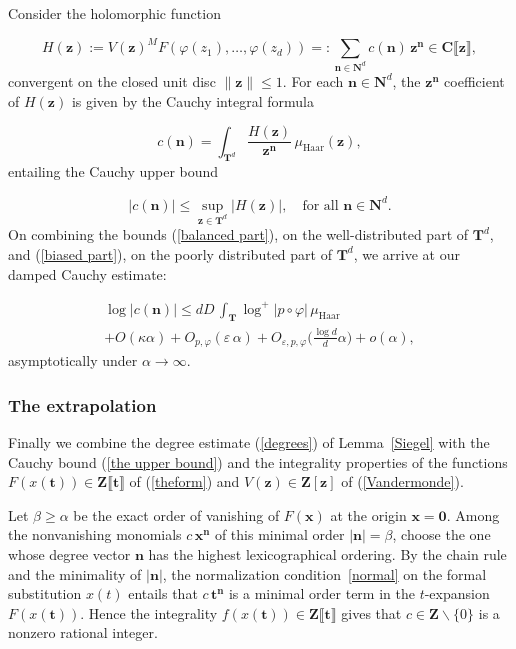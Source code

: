 \documentclass[10pt]{amsart}
\def\N{\pleaseuseothercommand}
\def\NwithzeroB{\mathbf{N}}
\renewcommand\setminus{\smallsetminus}
\def\T{\mathbf{T}}
\def\Z{\mathbf{Z}}
\theoremstyle{remark}
\numberwithin{equation}{subsection}
\def\numequation{\addtocounter{subsubsection}{1}\begin{equation}}
\def\C{\mathbf{C}}
\begin{document}
Consider the holomorphic function
\numequation  \label{our damped function}
H(\mathbf{z}) :=     V( \mathbf{z})^M    F(\varphi(z_1), \ldots, \varphi(z_d))  =: \sum_{\mathbf{n} \in \NwithzeroB^d}  c(\mathbf{n}) \, \mathbf{z^n}   \in \C\llbracket \mathbf{z} \rrbracket, 
\end{equation}
convergent on the closed unit disc $\| \mathbf{z} \| \leq 1$.  For each $\mathbf{n} \in \NwithzeroB^d$, the $\mathbf{z^n}$ coefficient  of $H(\mathbf{z})$ is given
by the Cauchy integral formula
\numequation \label{Cauchy}
c(\mathbf{n}) =  \int_{\T^d} \frac{ H(\mathbf{z}) }{ \mathbf{z^n}  } \, \mu_{\mathrm{Haar}}(\mathbf{z}), 
\end{equation}
entailing the Cauchy upper bound %
\numequation \label{CauchyBound}
 |c(\mathbf{n})|    \leq \sup_{\mathbf{z} \in \T^d} |H(\mathbf{z})|, \quad \textrm{for all } \mathbf{n} \in \NwithzeroB^d.
\end{equation}
On combining the bounds (\ref{balanced part}), on the well-distributed part of $\T^d$,   and (\ref{biased part}), on the 
poorly distributed part of $\T^d$, we arrive at our damped Cauchy estimate: 
\numequation
\begin{split}
 \label{the upper bound}
 \log{ |c(\mathbf{n})| }   \leq  dD \,
  \int_{\T} \log^+{ |p \circ \varphi|}  \, \mu_{\mathrm{Haar}} \\ 
  + O(\kappa  \alpha)  + O_{p,\varphi} (\varepsilon \, \alpha)  + O_{\varepsilon, p, \varphi}\Big(\frac{\log{d}}{d} \alpha \Big)  + o(\alpha), 
\end{split}
\end{equation}
asymptotically under $\alpha \to \infty$.




\subsubsection{The extrapolation}  \label{extrapolation part reprised}
Finally we combine the degree estimate (\ref{degrees}) of Lemma~\ref{Siegel} with the Cauchy bound (\ref{the upper bound}) 
and the integrality properties of the functions $F(x(\mathbf{t})) \in \Z\llbracket \mathbf{t} \rrbracket$ of (\ref{theform}) and $V(\mathbf{z}) \in \Z[\mathbf{z}]$ of (\ref{Vandermonde}).   


Let $\beta \geq \alpha$ be the exact order of vanishing of $F(\mathbf{x})$ at the origin $\mathbf{x = 0}$.    Among the nonvanishing monomials $c \, \mathbf{x^n}$ of this minimal order $|\mathbf{n}| = \beta$, choose the one whose degree vector $\mathbf{n}$ has the highest lexicographical ordering. By the chain rule and the minimality of $|\mathbf{n}|$, the normalization condition~\eqref{normal} on the formal substitution $x(t)$ entails that $c \, \mathbf{t^n}$ is a minimal order term in the $t$-expansion $F(x(\mathbf{t}))$. Hence the integrality $f(x(\mathbf{t})) \in \Z \llbracket \mathbf{t} \rrbracket$ gives that $c \in \Z \setminus \{0\}$ is a nonzero rational integer. 
\end{document}
